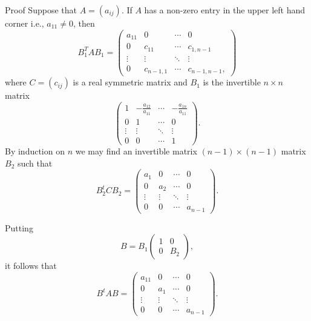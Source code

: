 \documentclass{article}
\begin{document}
\begin{hideinbutton}{Proof}
   Suppose that $A=(a_{ij})$. If $A$ has a non-zero entry in the upper
  left hand corner i.e., $a_{11}\neq 0$, then
  \begin{equation*}
    B_1^T A B_1 =
    \begin{pmatrix}
      a_{11} & 0 & \cdots & 0\\
      0 & c_{11} & \cdots & c_{1, n-1}\\
      \vdots & \vdots & \ddots & \vdots \\
      0 & c_{n-1, 1} & \cdots & c_{n-1, n-1},
    \end{pmatrix}
  \end{equation*}
  where $C = (c_{ij})$ is a real symmetric matrix and $B_1$ is the
  invertible $n\times n$ matrix
  \begin{equation*}
    \begin{pmatrix}
      1 & -\frac{ a_{12}}{a_{11}} & \cdots & -\frac{
        a_{1n}}{a_{11}}\\
      0 & 1 & \cdots & 0\\
      \vdots & \vdots & \ddots & \vdots\\
      0 & 0 & \cdots & 1
    \end{pmatrix}
    .
  \end{equation*}
  By induction on $n$ we may find an invertible matrix $(n-1)\times
  (n-1)$ matrix $B_2$ such that
  \begin{equation*}
    B_2^t C B_2 =
    \begin{pmatrix}
      a_1 & 0 &\cdots & 0\\
      0 & a_2 & \cdots & 0\\
      \vdots & \vdots & \ddots &\vdots\\
      0 & 0 & \cdots & a_{n-1}
    \end{pmatrix}
    .
  \end{equation*}
  
  Putting
  \begin{equation*}
B = B_1
    \begin{pmatrix}
      1 & 0\\
      0 & B_2
    \end{pmatrix},
    \end{equation*}
    it follows that
\begin{equation*}
    B^t A B =                           
    \begin{pmatrix}
      a_{11} & 0 &\cdots & 0\\
      0 & a_1 & \cdots & 0\\
      \vdots & \vdots & \ddots &\vdots\\
      0 & 0 & \cdots & a_{n-1}
    \end{pmatrix}
    .
  \end{equation*}
  

\end{hideinbutton}
\end{document}
